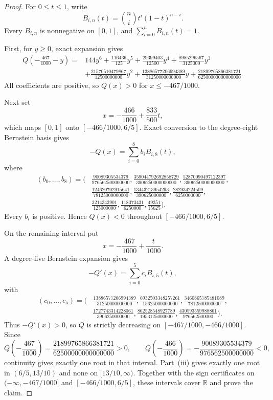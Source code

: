 \documentclass[11pt]{article}
\theoremstyle{remark}
\begin{document}
\begin{proof}
For \(0\le t\le1\), write
\[
B_{i,n}(t)=\binom ni t^i(1-t)^{n-i}.
\]
Every \(B_{i,n}\) is nonnegative on \([0,1]\), and
\(\sum_{i=0}^nB_{i,n}(t)=1\).

First, for \(y\ge0\), exact expansion gives
\[
\begin{aligned}
Q\!\left(-\frac{467}{1000}-y\right)={}&144y^6+\frac{116436}{125}y^5
+\frac{29399403}{12500}y^4+\frac{8985296567}{3125000}y^3\\
&+\frac{21570510479867}{12500000000}y^2
+\frac{13886577206994389}{31250000000000}y
+\frac{21899765866381721}{62500000000000000}.
\end{aligned}
\]
All coefficients are positive, so \(Q(x)>0\) for \(x\le-467/1000\).

Next set
\[
x=-\frac{466}{1000}+\frac{833}{500}t,
\]
which maps \([0,1]\) onto \([-466/1000,6/5]\). Exact conversion to the degree-eight Bernstein basis gives
\[
-Q(x)=\sum_{i=0}^8 b_iB_{i,8}(t),
\]
where
\[
\begin{aligned}
(b_0,\ldots,b_8)=\bigg(&
\frac{90089305534379}{976562500000000},
\frac{359044792692858729}{3906250000000000},
\frac{52870090497122397}{3906250000000000},\\
&\frac{124620702915641}{78125000000000},
\frac{13443213954293}{390625000000},
\frac{282934224509}{6250000000},\\
&\frac{3214343901}{125000000},
\frac{118373431}{6250000},
\frac{49351}{15625}\bigg).
\end{aligned}
\]
Every \(b_i\) is positive. Hence \(Q(x)<0\) throughout \([-466/1000,6/5]\).

On the remaining interval put
\[
x=-\frac{467}{1000}+\frac{t}{1000}.
\]
A degree-five Bernstein expansion gives
\[
-Q'(x)=\sum_{i=0}^5 c_iB_{i,5}(t),
\]
with
\[
\begin{aligned}
(c_0,\ldots,c_5)=\bigg(&
\frac{13886577206994389}{31250000000000},
\frac{6932503348257261}{15625000000000},
\frac{3460865785481089}{7812500000000},\\
&\frac{1727743314228061}{3906250000000},
\frac{862528548927789}{1953125000000},
\frac{430593559988861}{976562500000}\bigg).
\end{aligned}
\]
Thus \(-Q'(x)>0\), so \(Q\) is strictly decreasing on
\([-467/1000,-466/1000]\). Since
\[
Q\!\left(-\frac{467}{1000}\right)
=\frac{21899765866381721}{62500000000000000}>0,
\qquad
Q\!\left(-\frac{466}{1000}\right)
=-\frac{90089305534379}{976562500000000}<0,
\]
continuity gives exactly one root in that interval. Part~(iii) gives exactly one root in \((6/5,13/10)\) and none on \([13/10,\infty)\). Together with the sign certificates on
\(( -\infty,-467/1000]\) and \([-466/1000,6/5]\), these intervals cover \(\mathbb R\) and prove the claim.
\end{proof}
\end{document}
